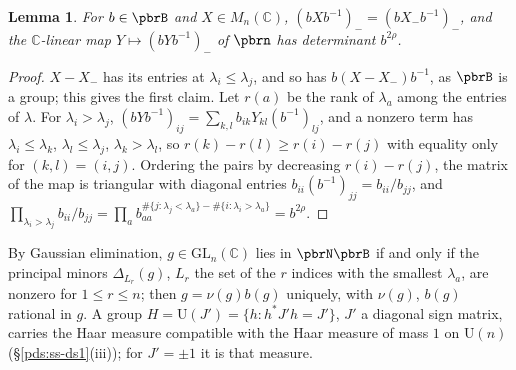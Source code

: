 \documentclass[10pt]{amsart}
\newtheorem{lemma}[theorem]{Lemma}
\theoremstyle{definition}
\theoremstyle{remark}
\newcommand{\C}{\mathbb C}
\providecommand{\auU}{\mathrm U}
\begin{document}
\begin{lemma}\label{pbr:jac}
For $b\in\pbrB$ and $X\in M_n(\C)$, $(bXb^{-1})_-=(bX_-b^{-1})_-$, and the $\C$-linear map
$Y\mapsto(bYb^{-1})_-$ of $\pbrn$ has determinant $b^{2\rho}$.
\end{lemma}
\begin{proof}
$X-X_-$ has its entries at $\lambda_i\le\lambda_j$, and so has $b(X-X_-)b^{-1}$, as $\pbrB$ is a group;
this gives the first claim. Let $r(a)$ be the rank of $\lambda_a$ among the entries of $\lambda$. For
$\lambda_i>\lambda_j$, $(bYb^{-1})_{ij}=\sum_{k,l}b_{ik}Y_{kl}(b^{-1})_{lj}$, and a nonzero term has
$\lambda_i\le\lambda_k$, $\lambda_l\le\lambda_j$, $\lambda_k>\lambda_l$, so $r(k)-r(l)\ge r(i)-r(j)$
with equality only for $(k,l)=(i,j)$. Ordering the pairs by decreasing $r(i)-r(j)$, the matrix of
the map is triangular with diagonal entries $b_{ii}(b^{-1})_{jj}=b_{ii}/b_{jj}$, and
$\prod_{\lambda_i>\lambda_j}b_{ii}/b_{jj}=\prod_ab_{aa}^{\#\{j:\lambda_j<\lambda_a\}-\#\{i:\lambda_i>
\lambda_a\}}=b^{2\rho}$.
\end{proof}

By Gaussian elimination, $g\in\mathrm{GL}_n(\C)$ lies in $\pbrN\pbrB$ if and only if the principal
minors $\Delta_{L_r}(g)$, $L_r$ the set of the $r$ indices with the smallest $\lambda_a$, are nonzero
for $1\le r\le n$; then $g=\nu(g)b(g)$ uniquely, with $\nu(g)$, $b(g)$ rational in $g$. A group
$H=\auU(J')=\{h:h^*J'h=J'\}$, $J'$ a diagonal sign matrix, carries the Haar measure compatible with
the Haar measure of mass $1$ on $\auU(n)$ (\S\ref{pds:ss-ds1}(iii)); for $J'=\pm1$ it is that measure.
\end{document}
